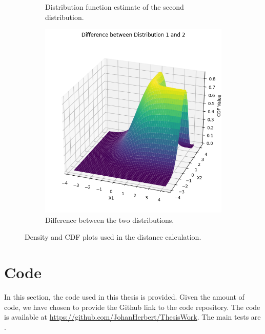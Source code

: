 \documentclass[%
a4paper,							
11pt,								
bibliography=totoc,						
abstracton=true					
]
{scrartcl}
\theoremstyle{plain}
\theoremstyle{definition}
\theoremstyle{remark}
\newcommand{\1}{\mathbbm{1}}
\begin{document}
\begin{figure}
\begin{subfigure}{0.45\textwidth}
        \caption{Distribution function estimate of the second distribution.}
        \label{fig:dist2}
    \end{subfigure}
    
    \vfill
    \begin{subfigure}{0.45\textwidth}
        \centering
        \includegraphics[width=\textwidth]{3Theory/pictures/diffDist1and2.png}
        \caption{Difference between the two distributions.}
        \label{fig:diffDist1and2}
    \end{subfigure}
    \caption{Density and CDF plots used in the distance calculation.}
    \label{fig:ApproxWasserstein}
\end{figure}





\newpage
\section{Code}\label{sec:Code}
In this section, the code used in this thesis is provided. Given the amount of code, we have chosen to provide the Github link to the code repository. The code is available at \url{https://github.com/JohanHerbert/ThesisWork}. The main tests are . 
\end{document}
